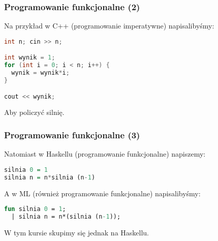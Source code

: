 \begin{frame}[fragile]
  \frametitle{Programowanie funkcjonalne (2)}
  Na przykład w C++ (programowanie imperatywne) napisalibyśmy:

  \begin{center}
    \begin{minipage}[c]{0.9\textwidth}
      \begin{lstlisting}[language=C++]
int n; cin >> n;

int wynik = 1;
for (int i = 0; i < n; i++) {
  wynik = wynik*i;
}

cout << wynik; 
      \end{lstlisting}
    \end{minipage}
  \end{center}
  \pause
  Aby policzyć silnię.
\end{frame}

\begin{frame}[fragile]
  \frametitle{Programowanie funkcjonalne (3)}
  Natomiast w Haskellu (programowanie funkcjonalne) napiszemy:

  \begin{center}
    \begin{minipage}[c]{0.9\textwidth}
      \begin{lstlisting}[language=haskell]
silnia 0 = 1
silnia n = n*silnia (n-1)
      \end{lstlisting}
    \end{minipage}
  \end{center}

  A w ML (również programowanie funkcjonalne) napisalibyśmy:
  \begin{center}
    \begin{minipage}[c]{0.9\textwidth}
      \begin{lstlisting}[language=ML]
fun silnia 0 = 1;
  | silnia n = n*(silnia (n-1));
      \end{lstlisting}
    \end{minipage}
  \end{center}

  W tym kursie skupimy się jednak na Haskellu.

\end{frame}
